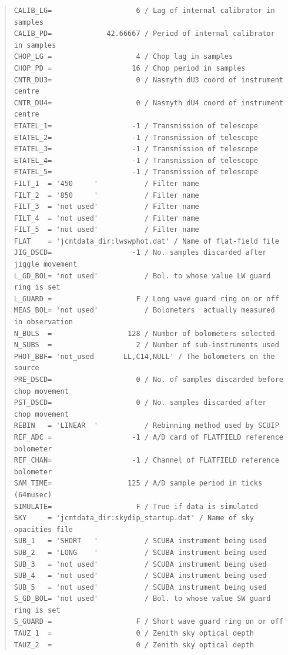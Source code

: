 \documentclass[twoside,11pt]{article}
\newenvironment{myquote}{\begin{quote}\begin{small}}{\end{small}\end{quote}}
\renewcommand{\_}{\texttt{\symbol{95}}}
\begin{document}
\begin{myquote}
\begin{verbatim}
CALIB_LG=                    6 / Lag of internal calibrator in samples
CALIB_PD=             42.66667 / Period of internal calibrator in samples
CHOP_LG =                    4 / Chop lag in samples
CHOP_PD =                   16 / Chop period in samples
CNTR_DU3=                    0 / Nasmyth dU3 coord of instrument centre
CNTR_DU4=                    0 / Nasmyth dU4 coord of instrument centre
ETATEL_1=                   -1 / Transmission of telescope
ETATEL_2=                   -1 / Transmission of telescope
ETATEL_3=                   -1 / Transmission of telescope
ETATEL_4=                   -1 / Transmission of telescope
ETATEL_5=                   -1 / Transmission of telescope
FILT_1  = '450     '           / Filter name
FILT_2  = '850     '           / Filter name
FILT_3  = 'not used'           / Filter name
FILT_4  = 'not used'           / Filter name
FILT_5  = 'not used'           / Filter name
FLAT    = 'jcmtdata_dir:lwswphot.dat' / Name of flat-field file
JIG_DSCD=                   -1 / No. samples discarded after jiggle movement
L_GD_BOL= 'not used'           / Bol. to whose value LW guard ring is set
L_GUARD =                    F / Long wave guard ring on or off
MEAS_BOL= 'not used'           / Bolometers  actually measured in observation
N_BOLS  =                  128 / Number of bolometers selected
N_SUBS  =                    2 / Number of sub-instruments used
PHOT_BBF= 'not_used       LL,C14,NULL' / The bolometers on the source
PRE_DSCD=                    0 / No. of samples discarded before chop movement
PST_DSCD=                    0 / No. samples discarded after chop movement
REBIN   = 'LINEAR  '           / Rebinning method used by SCUIP
REF_ADC =                   -1 / A/D card of FLATFIELD reference bolometer
REF_CHAN=                   -1 / Channel of FLATFIELD reference bolometer
SAM_TIME=                  125 / A/D sample period in ticks (64musec)
SIMULATE=                    F / True if data is simulated
SKY     = 'jcmtdata_dir:skydip_startup.dat' / Name of sky opacities file
SUB_1   = 'SHORT   '           / SCUBA instrument being used
SUB_2   = 'LONG    '           / SCUBA instrument being used
SUB_3   = 'not used'           / SCUBA instrument being used
SUB_4   = 'not used'           / SCUBA instrument being used
SUB_5   = 'not used'           / SCUBA instrument being used
S_GD_BOL= 'not used'           / Bol. to whose value SW guard ring is set
S_GUARD =                    F / Short wave guard ring on or off
TAUZ_1  =                    0 / Zenith sky optical depth
TAUZ_2  =                    0 / Zenith sky optical depth

\end{verbatim}
\end{myquote}
\end{document}
